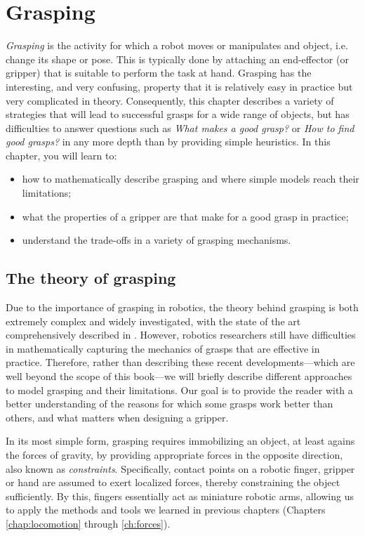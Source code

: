 \chapter{Grasping}\label{chap:grasping}

\textsl{Grasping} is the activity for which a robot moves or manipulates and object, i.e. change its shape or pose. This is typically done by attaching an end-effector (or gripper) that is suitable to perform the task at hand.
Grasping has the interesting, and very confusing, property that it is relatively easy in practice but very complicated in theory. Consequently, this chapter describes a variety of strategies that will lead to successful grasps for a wide range of objects, but has difficulties to answer questions such as \textsl{What makes a good grasp?} or \textsl{How to find good grasps?} in any more depth than by providing simple heuristics.
In this chapter, you will learn to:
\begin{itemize}
\item how to mathematically describe grasping and where simple models reach their limitations;
\item what the properties of a gripper are that make for a good grasp in practice;
\item understand the trade-offs in a variety of grasping mechanisms.
\end{itemize}

\section{The theory of grasping}

Due to the importance of grasping in robotics, the theory behind grasping is both extremely complex and widely investigated, with the state of the art comprehensively described in \cite{rimon2019mechanics}. However, robotics researchers still have difficulties in mathematically capturing the mechanics of grasps that are effective in practice. Therefore, rather than describing these recent developments---which are well beyond the scope of this book---we will briefly describe different approaches to model grasping and their limitations. Our goal is to provide the reader with a better understanding of the reasons for which some grasps work better than others, and what matters when designing a gripper.

In its most simple form, grasping requires immobilizing an object, at least agains the forces of gravity, by providing appropriate forces in the opposite direction, also known as \textsl{constraints}. Specifically, contact points on a robotic finger, gripper or hand are assumed to exert localized forces, thereby constraining the object sufficiently. By this, fingers essentially act as miniature robotic arms, allowing us to apply the methods and tools we learned in previous chapters (Chapters \ref{chap:locomotion} through \ref{ch:forces}).

